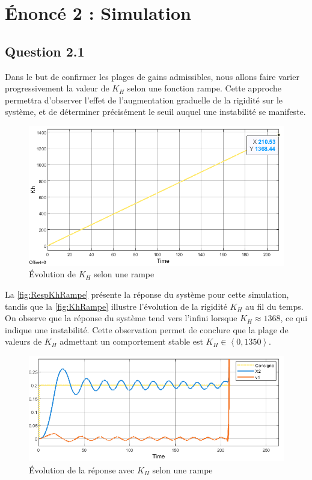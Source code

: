 \documentclass[a4paper,12pt]{article}
\begin{document}
    \newpage
    \section{Énoncé 2 : Simulation}
    \subsection{Question 2.1}
    Dans le but de confirmer les plages de gains admissibles, nous allons faire varier progressivement la valeur de $K_H$ selon une fonction rampe. Cette approche permettra d'observer l'effet de l'augmentation graduelle de la rigidité sur le système, et de déterminer précisément le seuil auquel une instabilité se manifeste.
    \begin{figure}[H]
        \centering
        \includegraphics[width=15cm]{./img/Kh_Evolution_Rampe.png}
        \caption{Évolution de $K_H$ selon une rampe\label{fig:KhRampe}}
    \end{figure}
    
    La \autoref{fig:RespKhRampe} présente la réponse du système pour cette simulation, tandis que la \autoref{fig:KhRampe} illustre l'évolution de la rigidité $K_H$ au fil du temps. On observe que la réponse du système tend vers l'infini lorsque $K_H \approx 1368$, ce qui indique une instabilité. Cette observation permet de conclure que la plage de valeurs de $K_H$  admettant un comportement stable est $K_H \in \left< 0, 1350 \right>$.
    \begin{figure}[H]
        \centering
        \includegraphics[width=16cm]{./img/response_KhRampe.png}
        \caption{Évolution de la réponse avec $K_H$ selon une rampe\label{fig:RespKhRampe}}
    \end{figure}
    
\end{document}
